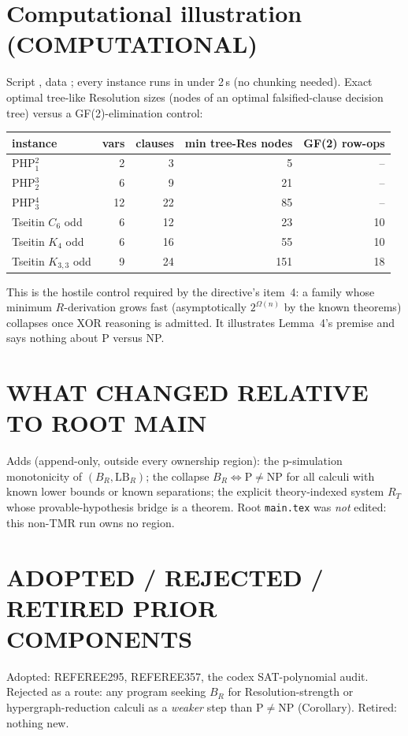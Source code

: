 \documentclass[11pt]{article}
\begin{document}
\section{Computational illustration (COMPUTATIONAL)}
Script ,
data ;
every instance runs in under 2\,s (no chunking needed).
Exact optimal tree-like Resolution sizes (nodes of an optimal falsified-clause
decision tree) versus a GF(2)-elimination control:
\begin{center}
\begin{tabular}{lrrrr}
\toprule
instance & vars & clauses & min tree-Res nodes & GF(2) row-ops\\
\midrule
PHP$^{2}_{1}$ & 2 & 3 & 5 & --\\
PHP$^{3}_{2}$ & 6 & 9 & 21 & --\\
PHP$^{4}_{3}$ & 12 & 22 & 85 & --\\
Tseitin $C_6$ odd & 6 & 12 & 23 & 10\\
Tseitin $K_4$ odd & 6 & 16 & 55 & 10\\
Tseitin $K_{3,3}$ odd & 9 & 24 & 151 & 18\\
\bottomrule
\end{tabular}
\end{center}
This is the hostile control required by the directive's item~4: a family whose
minimum $R$-derivation grows fast (asymptotically $2^{\Omega(n)}$ by the known
theorems) collapses once XOR reasoning is admitted. It illustrates Lemma~4's
premise and says nothing about $\mathrm P$ versus NP.

\section*{WHAT CHANGED RELATIVE TO ROOT MAIN}
Adds (append-only, outside every ownership region): the p-simulation
monotonicity of $(B_R,\mathrm{LB}_R)$; the collapse $B_R\iff\mathrm P\neq\mathrm{NP}$
for all calculi with known lower bounds or known separations; the explicit
theory-indexed system $R_T$ whose provable-hypothesis bridge is a theorem.
Root \texttt{main.tex} was \emph{not} edited: this non-TMR run owns no region.

\section*{ADOPTED / REJECTED / RETIRED PRIOR COMPONENTS}
Adopted: REFEREE295, REFEREE357, the codex SAT-polynomial audit. Rejected as
a route: any program seeking $B_R$ for Resolution-strength or
hypergraph-reduction calculi as a \emph{weaker} step than P$\neq$NP
(Corollary). Retired: nothing new.
\end{document}
